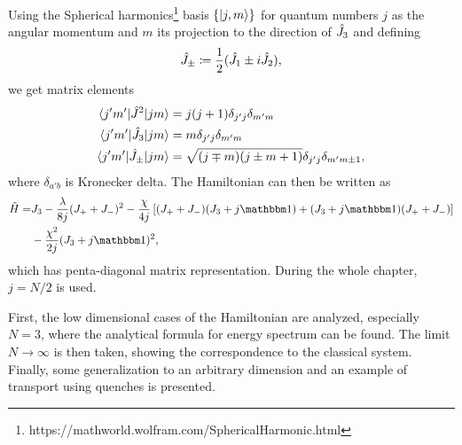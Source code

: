 Using the Spherical harmonics\footnote{https://mathworld.wolfram.com/SphericalHarmonic.html} basis $\{\ket{j,m}\}$ for quantum numbers $j$ as the angular momentum and $m$ its projection to the direction of $\hat{J}_3$ and defining
\begin{equation}
    \hat{J}_\pm\coloneqq\frac{1}{2}(\hat{J}_1\pm i\hat{J}_2),
\end{equation}
we get matrix elements
\begin{align}
    \braket{j'm'|\hat{J}^2|jm} &= j(j+1)\delta_{j'j}\delta_{m'm}\\
    \braket{j'm'|\hat{J}_3|jm} &= m \delta_{j'j}\delta_{m'm}\\
    \braket{j'm'|\hat{J}_\pm|jm} &= \sqrt{(j\mp m)(j\pm m+1)}\delta_{j'j}\delta_{m'm\pm 1},
\end{align}
where $\delta_{a'b}$ is Kronecker delta. The Hamiltonian can then be written as
\begin{equation}
\begin{split}
        \HH =& J_3-\frac{\lambda}{8j}(J_++J_-)^2-\frac{\chi}{4j}\left[(J_++J_-)(J_3+j\Id)+(J_3+j\Id)(J_++J_-)\right]\\
        &-\frac{\chi^2}{2j}(J_3+j\Id)^2,
\end{split}
\end{equation}
which has penta-diagonal matrix representation. During the whole chapter, $j=N/2$ is used. 

First, the low dimensional cases of the Hamiltonian are analyzed, especially $N=3$, where the analytical formula for energy spectrum can be found. The limit $N\rightarrow \infty$ is then taken, showing the correspondence to the classical system. Finally, some generalization to an arbitrary dimension and an example of transport using quenches is presented. 











